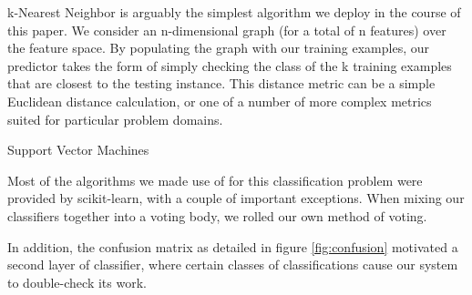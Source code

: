 k-Nearest Neighbor\cite{nearest} is arguably the simplest algorithm we 
deploy in the course of this paper.  We consider an n-dimensional 
graph (for a total of n features) over the feature space.  By populating 
the graph with our training examples, our predictor takes the form of 
simply checking the class of the k training examples that are closest 
to the testing instance.  This distance metric can be a simple 
Euclidean distance calculation, or one of a number of more complex 
metrics suited for particular problem domains.

Support Vector Machines


Most of the algorithms we made use of for this classification problem 
were provided by scikit-learn, with a couple of important exceptions.  
When mixing our classifiers together into a voting body, we rolled our 
own method of voting.

In addition, the confusion matrix as detailed in figure 
\ref{fig:confusion} motivated a second layer of classifier, where 
certain classes of classifications cause our system to double-check its 
work.  


